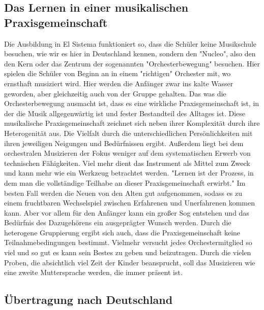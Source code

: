 \subsection{Das Lernen in einer musikalischen Praxisgemeinschaft}
Die Ausbildung in El Sistema funktioniert so, dass die Schüler keine Musikschule
besuchen, wie wir es hier in Deutschland kennen, sondern den "Nucleo", also den
den Kern oder das Zentrum der sogenannten "Orchesterbewegung" besuchen. Hier
spielen die Schüler von Beginn an in einem "richtigen" Orchester mit, wo
ernsthaft musiziert wird. Hier werden die Anfänger zwar ins kalte Wasser
geworden, aber gleichzeitig auch von der Gruppe gehalten.
Das was die Orchesterbewegung ausmacht ist, dass es eine wirkliche
Praxisgemeinschaft ist, in der die Musik allgegenwärtig ist und fester
Bestandteil des Alltages ist. Diese musikalische Praxisgemeinschaft zeichnet
sich neben ihrer Komplexität durch ihre Heterogenität aus. Die Vielfalt durch
die unterschiedlichen Persönlichkeiten mit ihren jeweiligen Neigungen und
Bedürfnissen ergibt. %
Außerdem liegt bei dem orchestralen Musizieren der Fokus weniger auf dem
systematischen Erwerb von technischen Fähigkeiten. Viel mehr dient das
Instrument als Mittel zum Zweck und kann mehr wie ein Werkzeug betrachtet
werden. "Lernen ist der Prozess, in dem man die vollständige Teilhabe an dieser
Praxisgemeinschaft erwirbt." Im besten Fall werden die Neuen von den Alten gut
aufgenommen, sodass es zu einem fruchtbaren Wechselspiel zwischen Erfahrenen und
Unerfahrenen kommen kann. Aber vor allem für den Anfänger kann ein großer Sog
entstehen und das Bedürfnis des Dazugehörens ein ausgeprägter Wunsch werden.
Durch die heterogene Gruppierung ergibt sich auch, dass die Praxisgemeinschaft
keine Teilnahmebedingungen bestimmt. Vielmehr versucht jedes Orchestermitglied
so viel und so gut es kann sein Bestes zu geben und beizutragen. Durch die
vielen Proben, die absichtlich viel Zeit der Kinder beansprucht, soll das
Musizieren wie eine zweite Muttersprache werden, die immer präsent ist.%


\subsection{Übertragung nach Deutschland}

